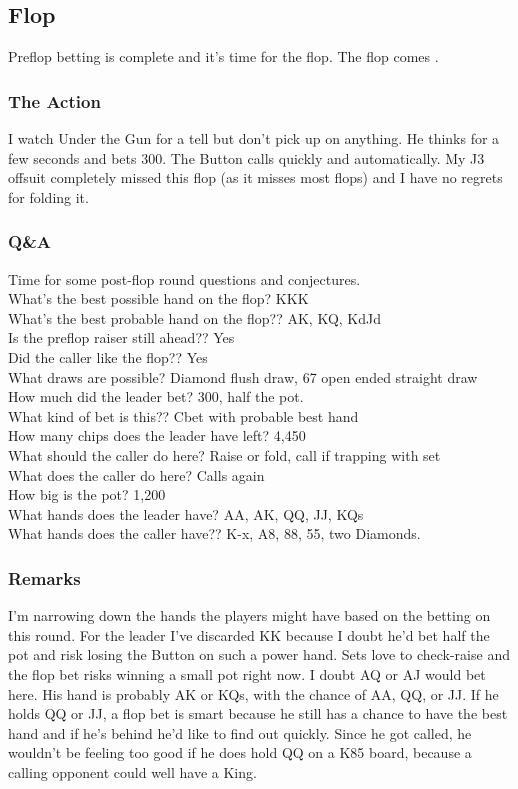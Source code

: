 \subsection*{Flop}

Preflop betting is complete and it's time for the flop.
The flop comes \Kc\eigd\fived.

\subsubsection*{The Action}
I watch Under the Gun for a tell but don't pick
up on anything. He thinks for a few seconds and bets 300. The Button calls
quickly and automatically. My J3 offsuit completely missed this
flop (as it misses most flops) and I have no regrets for folding it.

\subsubsection*{Q\&A}
Time for some post-flop round questions and conjectures. \\
What's the best possible hand on the flop? KKK \\
What's the best probable hand on the flop?? AK, KQ, KdJd \\
Is the preflop raiser still ahead?? Yes \\
Did the caller like the flop?? Yes \\
What draws are possible? Diamond flush draw, 67 open ended straight draw \\
How much did the leader bet? 300, half the pot. \\
What kind of bet is this?? Cbet with probable best hand \\
How many chips does the leader have left? 4,450 \\
What should the caller do here? Raise or fold, call if trapping with set \\
What does the caller do here? Calls again \\
How big is the pot? 1,200 \\
What hands does the leader have? AA, AK, QQ, JJ, KQs \\
What hands does the caller have?? K-x, A8, 88, 55, two Diamonds.

\subsubsection*{Remarks}
I'm narrowing down the hands the players might have based on the betting
on this round. For the leader I've discarded KK because I doubt he'd bet
half the pot and risk losing the Button on such a power hand. Sets love
to check-raise and the flop bet risks winning a small pot right now. I doubt AQ
or AJ would bet here. His hand is probably AK or KQs, with the chance
of AA, QQ, or JJ. If he holds QQ or JJ, a flop bet is smart because
he still has a chance to have the best hand and if he's behind he'd like
to find out quickly. Since he got called, he wouldn't be feeling too good
if he does hold QQ on a K85 board, because a calling opponent could
well have a King.

